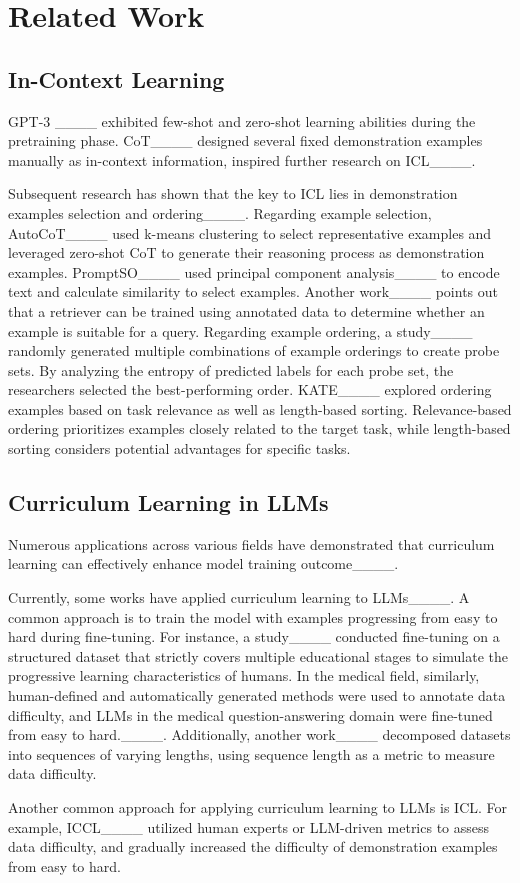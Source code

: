 \section{Related Work}
\subsection{In-Context Learning}
GPT-3 ____ exhibited few-shot and zero-shot learning abilities during the pretraining phase.
CoT____ designed several fixed demonstration examples manually as in-context information, inspired further research on ICL____.

Subsequent research has shown that the key to ICL lies in demonstration examples selection and ordering____.
Regarding example selection, AutoCoT____ used k-means clustering to select representative examples and leveraged zero-shot CoT to generate their reasoning process as demonstration examples.
PromptSO____ used principal component analysis____ to encode text and calculate similarity to select examples.
Another work____ points out that a retriever can be trained using annotated data to determine whether an example is suitable for a query.
Regarding example ordering, a study____ randomly generated multiple combinations of example orderings to create probe sets.
By analyzing the entropy of predicted labels for each probe set, the researchers selected the best-performing order.
KATE____ explored ordering examples based on task relevance as well as length-based sorting.
Relevance-based ordering prioritizes examples closely related to the target task, while length-based sorting considers potential advantages for specific tasks.


\subsection{Curriculum Learning in LLMs}
Numerous applications across various fields have demonstrated that curriculum learning can effectively enhance model training outcome____.

Currently, some works have applied curriculum learning to LLMs____.
A common approach is to train the model with examples progressing from easy to hard during fine-tuning.
For instance, a study____ conducted fine-tuning on a structured dataset that strictly covers multiple educational stages to simulate the progressive learning characteristics of humans.
In the medical field, similarly, human-defined and automatically generated methods were used to annotate data difficulty, and LLMs in the medical question-answering domain were fine-tuned from easy to hard.____.
Additionally, another work____ decomposed datasets into sequences of varying lengths, using sequence length as a metric to measure data difficulty.

Another common approach for applying curriculum learning to LLMs is ICL.
For example, ICCL____ utilized human experts or LLM-driven metrics to assess data difficulty, and gradually increased the difficulty of demonstration examples from easy to hard.